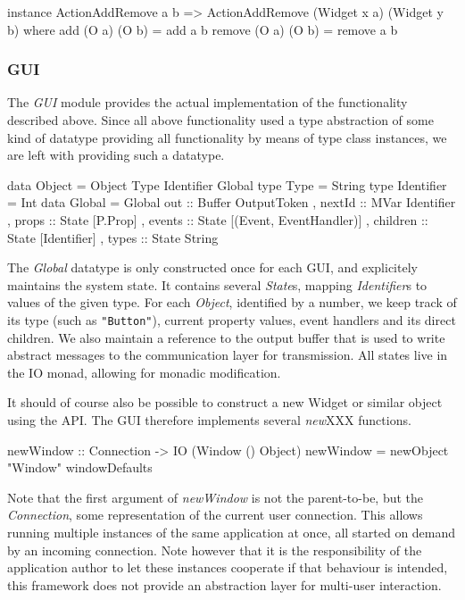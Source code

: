 \documentclass[11pt,a4paper]{article}
\begin{document}
\begin{haskell}
instance ActionAddRemove a b =>
  ActionAddRemove (Widget x a) (Widget y b) where
    add (O a) (O b) = add a b
    remove (O a) (O b) = remove a b
\end{haskell}

\subsubsection{GUI}
The \textit{GUI} module provides the actual implementation of the functionality described above.
Since all above functionality used a type abstraction of some kind of datatype providing all functionality by means of type class instances, we are left with providing such a datatype.

\begin{haskell}
data Object = Object Type Identifier Global
type Type = String
type Identifier = Int
data Global = Global { out      :: Buffer OutputToken
                     , nextId   :: MVar Identifier
                     , props    :: State [P.Prop]
                     , events   :: State [(Event, EventHandler)]
                     , children :: State [Identifier]
                     , types    :: State String
                     }
\end{haskell}

The \textit{Global} datatype is only constructed once for each GUI, and explicitely maintains the system state.
It contains several \textit{State}s, mapping \textit{Identifier}s to values of the given type.
For each \textit{Object}, identified by a number, we keep track of its type (such as \texttt{"Button"}), current property values, event handlers and its direct children.
We also maintain a reference to the output buffer that is used to write abstract messages to the communication layer for transmission.
All states live in the IO monad, allowing for monadic modification.

It should of course also be possible to construct a new Widget or similar object using the API.
The GUI therefore implements several \textit{new}XXX functions.
\begin{haskell}
newWindow :: Connection -> IO (Window () Object)
newWindow = newObject "Window" windowDefaults
\end{haskell}

Note that the first argument of \textit{newWindow} is not the parent-to-be, but the \textit{Connection}, some representation of the current user connection.
This allows running multiple instances of the same application at once, all started on demand by an incoming connection.
Note however that it is the responsibility of the application author to let these instances cooperate if that behaviour is intended, this framework does not provide an abstraction layer for multi-user interaction.
\end{document}
